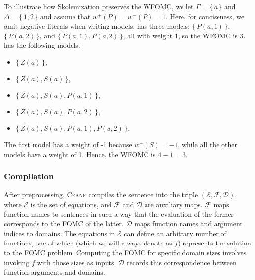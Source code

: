 \documentclass[a4paper,UKenglish,cleveref,autoref,table]{lipics-v2021}
\begin{document}
To illustrate how Skolemization preserves the WFOMC, we let $\Gamma = \{\,a\,\}$
and $\Delta = \{\,1, 2\,\}$ and assume that $w^+(P) = w^-(P) = 1$. Here, for
conciseness, we omit negative literals when writing models.
 has three models: $\{\,P(a, 1)\,\}$,
$\{\,P(a, 2)\,\}$, and $\{\,P(a, 1), P(a, 2)\,\}$, all with weight 1, so the
WFOMC is 3.  has the following models:
\begin{itemize}
  \item $\{\,Z(a)\,\}$,
  \item $\{\,Z(a), S(a)\,\}$,
  \item $\{\,Z(a), S(a), P(a, 1)\,\}$,
  \item $\{\,Z(a), S(a), P(a, 2)\,\}$,
  \item $\{\,Z(a), S(a), P(a, 1), P(a, 2)\,\}$.
\end{itemize}
The first model has a weight of -1 because $w^-(S) = -1$, while all the other
models have a weight of 1. Hence, the WFOMC is $4 - 1 = 3$.

\subsubsection{Compilation}\label{sec:compilation}

After preprocessing, \textsc{Crane} compiles the sentence into the triple
$(\mathcal{E}, \mathcal{F}, \mathcal{D})$, where $\mathcal{E}$ is the set of
equations, and $\mathcal{F}$ and $\mathcal{D}$ are auxiliary maps. $\mathcal{F}$
maps function names to sentences in such a way that the evaluation of the former
corresponds to the FOMC of the latter. $\mathcal{D}$ maps function names and
argument indices to domains. The equations in $\mathcal{E}$ can define an
arbitrary number of functions, one of which (which we will always denote as $f$)
represents the solution to the FOMC problem. Computing the FOMC for specific
domain sizes involves invoking $f$ with those sizes as inputs. $\mathcal{D}$
records this correspondence between function arguments and domains.
\end{document}
